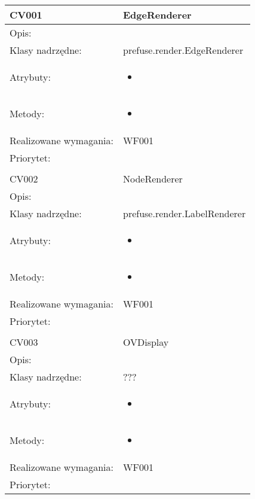 \documentclass[a4paper,10pt]{article}
\begin{document}
\begin{center}
 

\begin{tabular}{|m{3cm}|m{9cm}|} \hline

CV001 & EdgeRenderer \\ \hline
Opis: &     \\ \hline
Klasy nadrzędne: &  prefuse.render.EdgeRenderer   \\ \hline
Atrybuty: & \begin{itemize}
 \item 
\end{itemize}
 \\ \hline
Metody: & \begin{itemize}
 \item 
\end{itemize}
  \\ \hline
Realizowane wymagania: & WF001 \\ \hline
Priorytet: &  \\ \hline

\multicolumn{2}{c}{} \\
 \hline

CV002 & NodeRenderer \\ \hline
Opis: &     \\ \hline
Klasy nadrzędne: &  prefuse.render.LabelRenderer   \\ \hline
Atrybuty: & \begin{itemize}
 \item 
\end{itemize}
 \\ \hline
Metody: & \begin{itemize}
 \item 
\end{itemize}
  \\ \hline
Realizowane wymagania: & WF001 \\ \hline
Priorytet: &  \\ \hline

\multicolumn{2}{c}{} \\
 \hline

CV003 & OVDisplay \\ \hline
Opis: &     \\ \hline
Klasy nadrzędne: &  ???   \\ \hline
Atrybuty: & \begin{itemize}
 \item 
\end{itemize}
 \\ \hline
Metody: & \begin{itemize}
 \item 
\end{itemize}
  \\ \hline
Realizowane wymagania: & WF001 \\ \hline
Priorytet: &  \\ \hline


\end{tabular}
\end{center}
\end{document}
